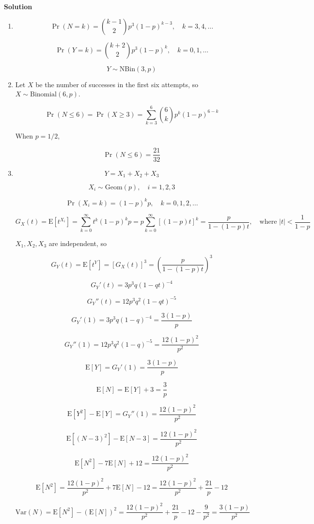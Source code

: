 \documentclass[a4paper]{article}
\newcommand{\solution}{\textbf{\large Solution}}
\newcommand{\E}{\mathrm{E}}
\newcommand{\Var}{\mathrm{Var}}
\begin{document}
\solution
\begin{enumerate}
    \item[(a)]

    $$
    \Pr(N = k) = \binom{k-1}{2} p^3 (1-p)^{k-3}, \quad k = 3,4,\ldots
    $$

    $$
    \Pr(Y = k) = \binom{k+2}{2} p^3 (1-p)^k, \quad k = 0,1,\ldots
    $$

    $$
    Y \sim \mathrm{NBin}(3,p)
    $$

    \item[(b)]
    
    Let $X$ be the number of successes in the first six attempts, so $X \sim \text{Binomial}(6, p)$.

    $$
    \Pr(N \le 6) = \Pr(X \ge 3) = \sum_{k=3}^6 \binom{6}{k} p^k (1 - p)^{6 - k}
    $$

    When $p = 1/2$,

    $$
    \Pr(N \le 6) = \frac{21}{32}
    $$

    \item[(c)]
    
    $$
    Y = X_1 + X_2 + X_3
    $$

    $$
    X_i \sim \text{Geom}(p), \quad i = 1,2,3
    $$

    $$
    \Pr(X_i = k) = (1 - p)^k p, \quad k = 0, 1, 2, \dots
    $$

    $$
    G_X(t)
    = \E[t^{X_i}]
    = \sum_{k=0}^\infty t^k (1 - p)^k p
    = p \sum_{k=0}^\infty [(1 - p)t]^k
    = \frac{p}{1 - (1 - p)t}, \quad \text{where } \vert{}t\vert{} < \frac{1}{1 - p}
    $$

    $X_1, X_2, X_3$ are independent, so

    $$
    G_Y(t)
    = \E[t^Y]
    = [G_X(t)]^3
    = \left( \frac{p}{1 - (1 - p)t} \right)^3
    $$

    $$
    G_Y'(t) = 3 p^3 q (1 - qt)^{-4}
    $$

    $$
    G_Y''(t) = 12 p^3 q^2 (1 - qt)^{-5}
    $$

    $$
    G_Y'(1) = 3 p^3 q (1 - q)^{-4} = \frac{3(1-p)}{p}
    $$

    $$
    G_Y''(1) = 12 p^3 q^2 (1 - q)^{-5} = \frac{12(1-p)^2}{p^2}
    $$

    $$
    \E[Y] = G_Y'(1) = \frac{3(1-p)}{p}
    $$

    $$
    \E[N] = \E[Y] + 3 = \frac{3}{p}
    $$

    $$
    \E[Y^2] - \E[Y] = G_Y''(1) = \frac{12(1-p)^2}{p^2}
    $$

    $$
    \E[(N-3)^2] - \E[N-3] = \frac{12(1-p)^2}{p^2}
    $$

    $$
    \E[N^2] - 7 \E[N] + 12 = \frac{12(1-p)^2}{p^2}
    $$

    $$
    \E[N^2] = \frac{12(1-p)^2}{p^2} + 7 \E[N] - 12 = \frac{12(1-p)^2}{p^2} + \frac{21}{p} - 12
    $$

    $$
    \Var(N) = \E[N^2] - (\E[N])^2 = \frac{12(1-p)^2}{p^2} + \frac{21}{p} - 12 - \frac{9}{p^2} = \frac{3(1-p)}{p^2}
    $$
\end{enumerate}
\end{document}

